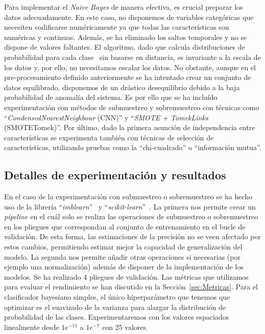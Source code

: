\documentclass[12pt,letterpaper]{article}
\begin{document}
Para implementar el \textit{Naive Bayes} de manera efectiva, es crucial preparar los datos adecuadamente. 
En este caso, no disponemos de variables categóricas que necesiten codificarse numéricamente ya que todas las características son numéricas y continuas. 
Además, se ha eliminado los saltos temporales y no se dispone de valores faltantes.
El algoritmo, dado que calcula distribuciones de probabilidad para cada clase~\cite{NaiveBayes} sin basarse en distancia, es invariante a la escala de los datos y, por ello, no necesitamos escalar los datos.
No obstante, aunque en el pre-procesamiento definido anteriormente se ha intentado crear un conjunto de datos equilibrado, disponemos de un drástico desequilibrio debido a la baja probabilidad de anomalía del sistema.
Es por ello que se ha incluído experimentación con métodos de submuestreo y sobremuestreo con técnicas como ``\textit{CondensedNearestNeighbour} (CNN)'' y ``\textit{SMOTE + TomekLinks} (SMOTETomek)''.
Por último, dado la primera asunción de independencia entre características se experimenta también con técnicas de selección de características, utilizando pruebas como la ``chi-cuadrado'' o ``información mutua''.

\subsection{Detalles de experimentación y resultados}\label{sec:ExpBayes}
En el caso de la experimentación con submuestreo o sobremuestreo se ha hecho uso de la librería ``\textit{imblearn}''~\cite{imblearn} y ``\textit{scikit-learn}''~\cite{sklearn}. 
La primera nos permite crear un \textit{pipeline} en el cuál solo se realiza las operaciones de submuestreo o sobremuestreo en los pliegues que correspondan al conjunto de entrenamiento en el bucle de validación. 
De esta forma, las estimaciones de la precisión no se veen afectado por estos cambios, permitiendo estimar mejor la capacidad de generalización del modelo. La segunda nos permite añadir otras operaciones si necesarias (por ejemplo una normalización) además de disponer de la implementación de los modelos.
Se ha realizado 4 pliegues de validación. Las métricas que utilizamos para evaluar el rendimiento se han discutido en la Sección~\ref{sec:Metricas}.
Para el clasificador bayesiano simples, el único hiperparámetro que tenemos que optimizar es el suavizado de la varianza para alargar la distribución de probabilidad de las clases.
Experimentaremos con los valores espaciados linealmente desde $1e^{-11 }$ a $1e^{-7}$ con 25 valores.
\end{document}
